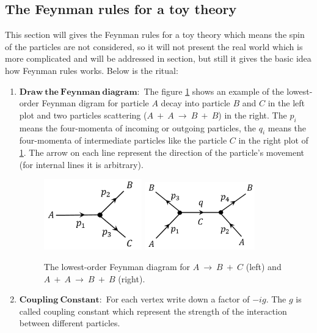 \subsection{The Feynman rules for a toy theory}\label{subsubsec:feynman_toy}
This section will gives the Feynman rules for a toy theory which means the spin of the particles are not considered, so it will not present the real world which is more complicated and will be addressed in section, but still it gives the basic idea how Feynman rules works. Below is the ritual:
\begin{enumerate}
\item $\mathbf{Draw~the~Feynman~diagram:}$ The figure \ref{fig:feynman_decay_scatter} shows an example of the lowest-order Feynman digram for particle $A$ decay into particle $B$ and $C$ in the left plot and two particles scattering ($A~+~A~\rightarrow~B~+~B$) in the right. The $p_{i}$ means the four-momenta of incoming or outgoing particles, the $q_{i}$ means the four-momenta of intermediate particles like the particle $C$ in the right plot of \ref{fig:feynman_decay_scatter}. The arrow on each line represent the direction of the particle's movement (for internal lines it is arbitrary).
\begin{figure}[h!]
 \begin{center}
\includegraphics[width=0.4\textwidth]{figures/theory/feynman_decay.png}
\includegraphics[width=0.45\textwidth]{figures/theory/feynman_scatter.png}
\caption{The lowest-order Feynman diagram for $A~\rightarrow~B~+~C$ (left) and $A~+~A~\rightarrow~B~+~B$ (right).}
  \label{fig:feynman_decay_scatter}
 \end{center}
\end{figure}
\item $\mathbf{Coupling~Constant:}$ For each vertex write down a factor of $-ig$. The $g$ is called coupling constant which represent the strength of the interaction between different particles.

\end{enumerate}
